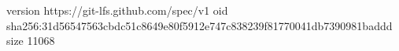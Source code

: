 version https://git-lfs.github.com/spec/v1
oid sha256:31d56547563cbdc51c8649e80f5912e747c838239f81770041db7390981baddd
size 11068
